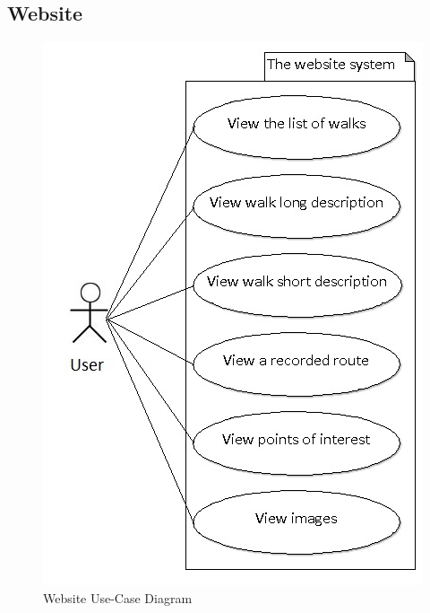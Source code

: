 \documentclass[12pt]{article}
\begin{document}
\subsection{Website}
\begin{figure}[htp]
\centering
\includegraphics[scale=0.50]{Project_Plan/docs/website_use_case.jpg}
\caption{Website Use-Case Diagram}
\label{Website Use-Case Diagram}
\end{figure}
\end{document}
